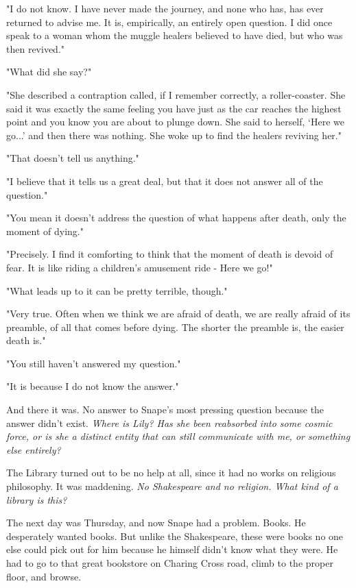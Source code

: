 "I do not know. I have never made the journey, and none who has, has ever returned to advise me. It is, empirically, an entirely open question. I did once speak to a woman whom the muggle healers believed to have died, but who was then revived."

"What did she say?"

"She described a contraption called, if I remember correctly, a roller-coaster. She said it was exactly the same feeling you have just as the car reaches the highest point and you know you are about to plunge down. She said to herself, `Here we go...' and then there was nothing. She woke up to find the healers reviving her."

"That doesn't tell us anything."

"I believe that it tells us a great deal, but that it does not answer all of the question."

"You mean it doesn't address the question of what happens after death, only the moment of dying."

"Precisely. I find it comforting to think that the moment of death is devoid of fear. It is like riding a children's amusement ride - Here we go!"

"What leads up to it can be pretty terrible, though."

"Very true. Often when we think we are afraid of death, we are really afraid of its preamble, of all that comes before dying. The shorter the preamble is, the easier death is."

"You still haven't answered my question."

"It is because I do not know the answer."

And there it was. No answer to Snape's most pressing question because the answer didn't exist. \emph{Where is Lily? Has she been reabsorbed into some cosmic force, or is she a distinct entity that can still communicate with me, or something else entirely?}

The Library turned out to be no help at all, since it had no works on religious philosophy. It was maddening. \emph{No Shakespeare and no religion. What kind of a library is this?}

The next day was Thursday, and now Snape had a problem. Books. He desperately wanted books. But unlike the Shakespeare, these were books no one else could pick out for him because he himself didn't know what they were. He had to go to that great bookstore on Charing Cross road, climb to the proper floor, and browse.


